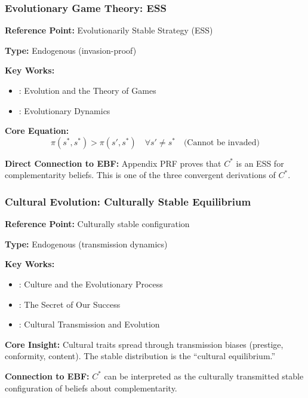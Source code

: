 \subsubsection{Evolutionary Game Theory: ESS}

\begin{tcolorbox}[colback=gray!5!white, colframe=gray!75!black]
\textbf{Reference Point:} Evolutionarily Stable Strategy (ESS)

\textbf{Type:} Endogenous (invasion-proof)

\textbf{Key Works:}
\begin{itemize}[nosep]
    \item \citet{maynardsmith1982}: Evolution and the Theory of Games
    \item \citet{nowak2006}: Evolutionary Dynamics
\end{itemize}

\textbf{Core Equation:}
\begin{equation}
\pi(s^*, s^*) > \pi(s', s^*) \quad \forall s' \neq s^* \quad \text{(Cannot be invaded)}
\end{equation}

\textbf{Direct Connection to EBF:}
Appendix PRF proves that $C^*$ is an ESS for complementarity beliefs.
This is one of the three convergent derivations of $C^*$.
\end{tcolorbox}

\subsubsection{Cultural Evolution: Culturally Stable Equilibrium}

\begin{tcolorbox}[colback=gray!5!white, colframe=gray!75!black]
\textbf{Reference Point:} Culturally stable configuration

\textbf{Type:} Endogenous (transmission dynamics)

\textbf{Key Works:}
\begin{itemize}[nosep]
    \item \citet{boydricherson}: Culture and the Evolutionary Process
    \item \citet{henrich2015}: The Secret of Our Success
    \item \citet{cavallisforza1981}: Cultural Transmission and Evolution
\end{itemize}

\textbf{Core Insight:}
Cultural traits spread through transmission biases (prestige, conformity, content).
The stable distribution is the ``cultural equilibrium.''

\textbf{Connection to EBF:}
$C^*$ can be interpreted as the culturally transmitted stable configuration
of beliefs about complementarity.
\end{tcolorbox}


